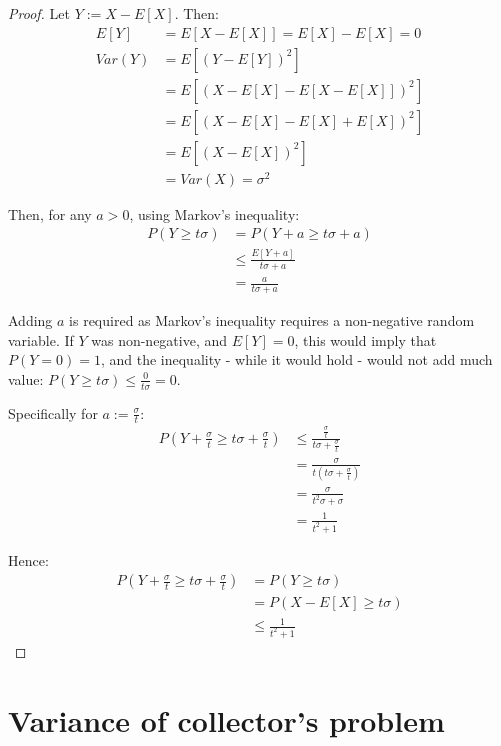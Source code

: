 \documentclass[a4paper]{scrreprt}
\begin{document}
\begin{proof}
	Let $Y := X - E[X]$. Then:
	\begin{align*}
		E[Y] & = E[X - E[X]] = E[X] - E[X] = 0 \\
		Var(Y) & = E[(Y - E[Y])^2] \\
		       & = E[(X - E[X] - E[X - E[X]])^2] \\
		       & = E[(X - E[X] - E[X] + E[X])^2] \\
		       & = E[(X - E[X])^2] \\
		       & = Var(X) = \sigma^2
	\end{align*}

	Then, for any $a > 0$, using Markov's inequality:
	\begin{align*}
		P(Y \geq t \sigma) & = P(Y + a \geq t \sigma + a) \\
				   & \leq \frac{E[Y + a]}{t \sigma + a} \\
		     & = \frac{a}{t \sigma + a}
	\end{align*}

	Adding $a$ is required as Markov's inequality requires a non-negative
	random variable. If $Y$ was non-negative, and $E[Y] = 0$, this would
	imply that $P(Y = 0) = 1$, and the inequality - while it would hold -
	would not add much value: $P(Y \geq t \sigma) \leq \frac{0}{t \sigma} = 0$.

	Specifically for $a := \frac{\sigma}{t}$:
	\begin{align*}
		P(Y + \frac{\sigma}{t} \geq t \sigma + \frac{\sigma}{t}) & \leq \frac{\frac{\sigma}{t}}{t \sigma + \frac{\sigma}{t}} \\
		& = \frac{\sigma}{t (t \sigma + \frac{\sigma}{t})} \\
		& = \frac{\sigma}{t^2 \sigma + \sigma} \\
		& = \frac{1}{t^2 + 1}
	\end{align*}

	Hence:
	\begin{align*}
		P(Y + \frac{\sigma}{t} \geq t \sigma + \frac{\sigma}{t}) & = P(Y \geq t \sigma) \\
		& = P(X - E[X] \geq t \sigma) \\
		& \leq \frac{1}{t^2 + 1}
	\end{align*}
\end{proof}

\section{Variance of collector's problem}
\end{document}
